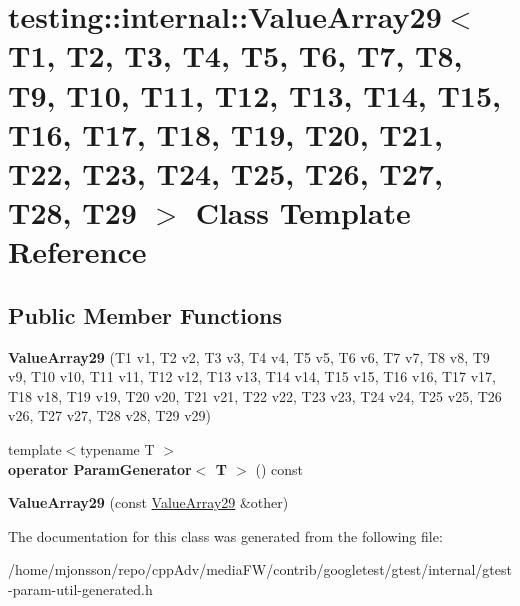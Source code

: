 \hypertarget{classtesting_1_1internal_1_1ValueArray29}{}\section{testing\+:\+:internal\+:\+:Value\+Array29$<$ T1, T2, T3, T4, T5, T6, T7, T8, T9, T10, T11, T12, T13, T14, T15, T16, T17, T18, T19, T20, T21, T22, T23, T24, T25, T26, T27, T28, T29 $>$ Class Template Reference}
\label{classtesting_1_1internal_1_1ValueArray29}
\subsection*{Public Member Functions}
\begin{DoxyCompactItemize}
\item 
\mbox{\label{classtesting_1_1internal_1_1ValueArray29_abd74fbc38f76f1e3baf28db3b6daa21a}} 
{\bfseries Value\+Array29} (T1 v1, T2 v2, T3 v3, T4 v4, T5 v5, T6 v6, T7 v7, T8 v8, T9 v9, T10 v10, T11 v11, T12 v12, T13 v13, T14 v14, T15 v15, T16 v16, T17 v17, T18 v18, T19 v19, T20 v20, T21 v21, T22 v22, T23 v23, T24 v24, T25 v25, T26 v26, T27 v27, T28 v28, T29 v29)
\item 
\mbox{\label{classtesting_1_1internal_1_1ValueArray29_ace48d673ae6e563b5bf1ceaa2512ad42}} 
{\footnotesize template$<$typename T $>$ }\\{\bfseries operator Param\+Generator$<$ T $>$} () const
\item 
\mbox{\label{classtesting_1_1internal_1_1ValueArray29_a4e5b252f7ffcd6380acc012ccf59a0f4}} 
{\bfseries Value\+Array29} (const \hyperlink{classtesting_1_1internal_1_1ValueArray29}{Value\+Array29} \&other)
\end{DoxyCompactItemize}


The documentation for this class was generated from the following file\+:\begin{DoxyCompactItemize}
\item 
/home/mjonsson/repo/cpp\+Adv/media\+F\+W/contrib/googletest/gtest/internal/gtest-\/param-\/util-\/generated.\+h\end{DoxyCompactItemize}
